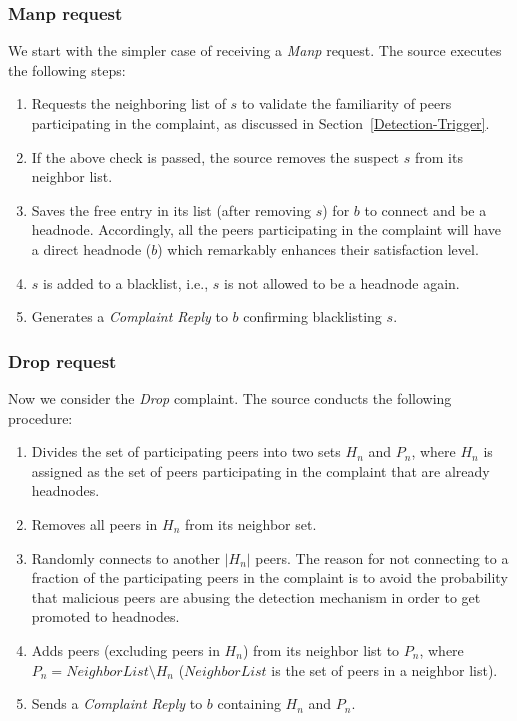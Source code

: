 \subsubsection*{Manp request}
We start with the simpler case of receiving a \textit{Manp} request. 
The source executes the following steps:
\begin{enumerate}
 \item Requests the neighboring list of $s$ to validate the familiarity of peers participating in the complaint, as discussed in Section~\ref{Detection-Trigger}.
 \item If the above check is passed, the source removes the suspect $s$ from its neighbor list.
 \item Saves the free entry in its list (after removing $s$) for $b$ to connect and be a headnode.
 Accordingly, all the peers participating in the complaint will have a direct headnode ($b$) which remarkably enhances their satisfaction level.
 \item $s$ is added to a blacklist, i.e., $s$ is not allowed to be a headnode again.
 \item Generates a \textit{Complaint Reply} to $b$ confirming blacklisting $s$.
\end{enumerate}

\subsubsection*{Drop request}
Now we consider the \textit{Drop} complaint. The source conducts the following procedure:
\begin{enumerate}
 \item Divides the set of participating peers into two sets $H_n$ and $P_n$, where $H_n$ is assigned as the set of peers participating in the complaint that are already headnodes.
 \item Removes all peers in $H_n$ from its neighbor set.
 \item Randomly connects to another $|H_n|$ peers. 
 The reason for not connecting to a fraction of the participating peers in the complaint is to avoid the probability that malicious peers are abusing the detection mechanism in order to get promoted to headnodes.
 \item Adds peers (excluding peers in $H_n$) from its neighbor list to $P_n$, where $P_n = NeighborList\setminus H_n$ ($NeighborList$ is the set of peers in a neighbor list).
 \item Sends a \textit{Complaint Reply} to $b$ containing $H_n$ and $P_n$.
\end{enumerate}

